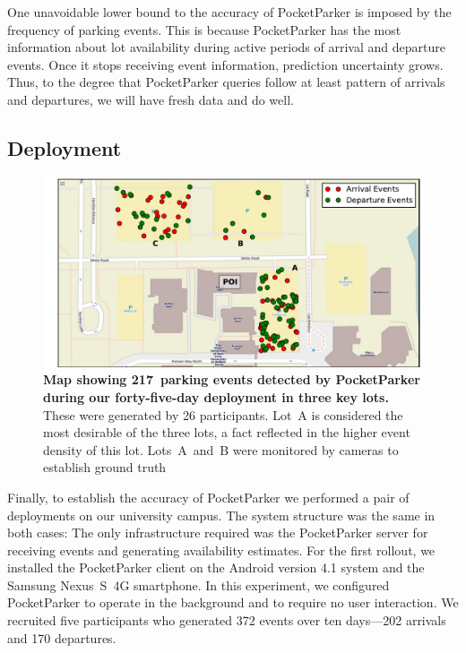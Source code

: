 One unavoidable lower bound to the accuracy of PocketParker is imposed by the
frequency of parking events.  This is because PocketParker has the most
information about lot availability during active periods of arrival and
departure events. Once it stops receiving event information, prediction
uncertainty grows.  Thus, to the degree that PocketParker queries follow at
least pattern of arrivals and departures, we will have fresh data and do well.

\subsection{Deployment}

\begin{figure}
\centering
\includegraphics[width=\textwidth]{./figures/EventsOnThreeParkingLot.pdf}

\caption{\textbf{Map showing 217~parking events detected by PocketParker
during our forty-five-day deployment in three key lots.}  These were
generated by 26 participants.  Lot~A is considered the most desirable of the
three lots, a fact reflected in the higher event density of this lot.  
Lots~A~and~B were monitored by cameras to establish ground truth}

\label{fig-events}
\end{figure}

Finally, to establish the accuracy of PocketParker we performed a pair of
deployments on our university campus.  The system structure was the same in
both cases:  The only infrastructure required was the PocketParker server for
receiving events and generating availability estimates.  For the first
rollout, we installed the PocketParker client on the Android version 4.1
system and the Samsung Nexus~S~4G smartphone.  In this experiment, we
configured PocketParker to operate in the background and to require no user
interaction.   We recruited five participants who generated 372 events over
ten days---202 arrivals and 170 departures.

